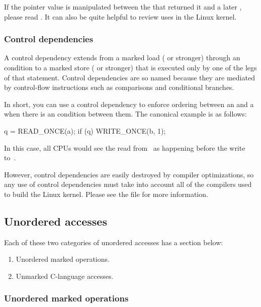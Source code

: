 If the pointer value is manipulated between the 
that returned it and a later , please read
.
It can also be quite helpful to review uses in the Linux kernel.


\subsubsection{Control dependencies}

A control dependency extends from a marked load ( or stronger)
through an  condition to a marked store ( or stronger)
that is executed only by one of the legs of that  statement.
Control dependencies are so named because they are mediated by
control-flow instructions such as comparisons and conditional branches.

In short, you can use a control dependency to enforce ordering between
an  and a  when there is an  condition
between them.
The canonical example is as follows:

\begin{VerbatimU}
	q = READ_ONCE(a);
	if (q)
		WRITE_ONCE(b, 1);
\end{VerbatimU}

In this case, all CPUs would see the read from~ as happening before
the write to~.

However, control dependencies are easily destroyed by compiler
optimizations, so any use of control dependencies must take into account
all of the compilers used to build the Linux kernel.
Please see the  file for more information.


\subsection{Unordered accesses}

Each of these two categories of unordered accesses has a section below:

\begin{enumerate}
 \item	Unordered marked operations.

 \item	Unmarked C-language accesses.
\end{enumerate}


\subsubsection{Unordered marked operations}


